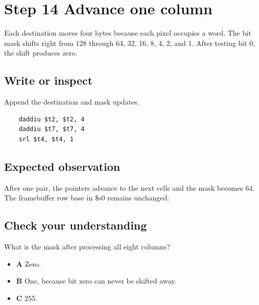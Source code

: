 \section{Step 14 Advance one
  column}\label{003-eight-byte-sprite-s14-step-14-advance-one-column}

Each destination moves four bytes because each pixel occupies a word.
The bit mask shifts right from 128 through 64, 32, 16, 8, 4, 2, and 1.
After testing bit 0, the shift produces zero.

\subsection{Write or
  inspect}\label{003-eight-byte-sprite-s14-write-or-inspect}

Append the destination and mask updates.

\begin{verbatim}
    daddiu $t2, $t2, 4
    daddiu $t7, $t7, 4
    srl $t4, $t4, 1
\end{verbatim}

\subsection{Expected
  observation}\label{003-eight-byte-sprite-s14-expected-observation}

After one pair, the pointers advance to the next cells and the mask
becomes 64. The framebuffer row base in \$s0 remains unchanged.

\subsection{Check your
  understanding}\label{003-eight-byte-sprite-s14-check-your-understanding}

What is the mask after processing all eight columns?

\begin{itemize}
  \tightlist
  \item
        \textbf{A} Zero.
  \item
        \textbf{B} One, because bit zero can never be shifted away.
  \item
        \textbf{C} 255.
\end{itemize}
